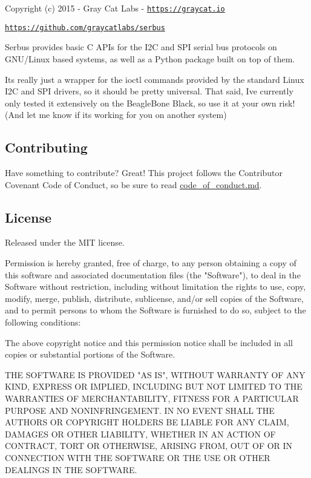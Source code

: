 Copyright (c) 2015 -\/ Gray Cat Labs -\/ \href{https://graycat.io}{\tt https\+://graycat.\+io}

\href{https://github.com/graycatlabs/serbus}{\tt https\+://github.\+com/graycatlabs/serbus}

Serbus provides basic C A\+P\+Is for the I2\+C and S\+P\+I serial bus protocols on G\+N\+U/\+Linux based systems, as well as a Python package built on top of them.

It\textquotesingle{}s really just a wrapper for the ioctl commands provided by the standard Linux I2\+C and S\+P\+I drivers, so it should be pretty universal. That said, I\textquotesingle{}ve currently only tested it extensively on the Beagle\+Bone Black, so use it at your own risk! (And let me know if it\textquotesingle{}s working for you on another system)

\subsection*{Contributing}

Have something to contribute? Great! This project follows the Contributor Covenant Code of Conduct, so be sure to read {\ttfamily \hyperlink{code__of__conduct_8md_source}{code\+\_\+of\+\_\+conduct.\+md}}.

\subsection*{License}

Released under the M\+I\+T license. \begin{DoxyVerb}Permission is hereby granted, free of charge, to any person obtaining a copy
of this software and associated documentation files (the "Software"), to deal
in the Software without restriction, including without limitation the rights
to use, copy, modify, merge, publish, distribute, sublicense, and/or sell
copies of the Software, and to permit persons to whom the Software is
furnished to do so, subject to the following conditions:

The above copyright notice and this permission notice shall be included in
all copies or substantial portions of the Software.

THE SOFTWARE IS PROVIDED "AS IS", WITHOUT WARRANTY OF ANY KIND, EXPRESS OR
IMPLIED, INCLUDING BUT NOT LIMITED TO THE WARRANTIES OF MERCHANTABILITY,
FITNESS FOR A PARTICULAR PURPOSE AND NONINFRINGEMENT. IN NO EVENT SHALL THE
AUTHORS OR COPYRIGHT HOLDERS BE LIABLE FOR ANY CLAIM, DAMAGES OR OTHER
LIABILITY, WHETHER IN AN ACTION OF CONTRACT, TORT OR OTHERWISE, ARISING FROM,
OUT OF OR IN CONNECTION WITH THE SOFTWARE OR THE USE OR OTHER DEALINGS IN
THE SOFTWARE. \end{DoxyVerb}
 